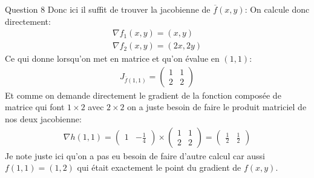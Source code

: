 \begin{parag}{Question 8}
    Donc ici il suffit de trouver la jacobienne de $\overline{f}\left(x, y\right)$:
    On calcule donc directement:
    \begin{align*} \nabla f_1\left(x, y\right) = \left(x, y\right)\\
    \nabla f_2\left(x, y\right) = \left(2x, 2y\right)\end{align*}
    Ce qui donne lorsqu'on met en matrice et qu'on évalue en $\left(1, 1\right)$:
    \begin{align*} J_{\overline{f}\left(1, 1\right)} = \begin{pmatrix} 1 & 1 \\ 2 & 2 \end{pmatrix}  \end{align*}
    Et comme on demande directement le gradient de la fonction composée de matrice qui font $1 \times 2 $ avec $2 \times 2$ on a juste besoin de faire le produit matriciel de nos deux jacobienne:
    \begin{align*} \nabla h\left(1, 1\right) = \begin{pmatrix} 1 & -\frac{1}{4} \end{pmatrix} \times\begin{pmatrix} 1 & 1 \\ 2 & 2 \end{pmatrix} = \begin{pmatrix} \frac{1}{2} & \frac{1}{2} \end{pmatrix}  \end{align*}
    Je note juste ici qu'on a pas eu besoin de faire d'autre calcul car aussi $f\left(1, 1\right) = \left(1, 2\right)$ qui était exactement le point du gradient de $f\left(x, y\right)$.
\end{parag}




